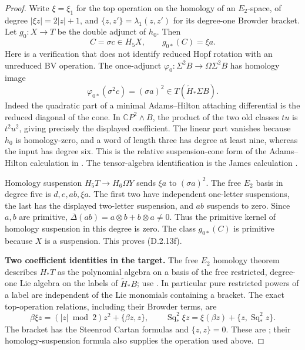 \begin{proof}
Write $\xi=\xi_1$ for the top operation on the homology of an
$E_2$-space, of degree $|\xi z|=2|z|+1$, and
$\{z,z'\}=\lambda_1(z,z')$ for its degree-one Browder bracket.
Let $g_0:X\to T$ be the double adjunct of $h_0$. Then
\[
 C=\sigma c\in H_5X,\qquad g_{0*}(C)=\xi a.
 \tag{D.2.13f}
\]
Here is a verification that does not identify reduced Hopf rotation
with an unreduced BV operation. The once-adjunct
$\varphi_0:\Sigma^2B\to\Omega\Sigma^2B$ has homology image
\[
 \varphi_{0*}(\sigma^2c)=(\sigma a)^2
       \in T(\widetilde H_*\Sigma B).
 \tag{D.2.13g}
\]
Indeed the quadratic part of a minimal Adams--Hilton attaching
differential is the reduced diagonal of the cone. In
$\mathbb CP^2\wedge B$, the product of the two old classes $tu$
is $t^2u^2$, giving precisely the displayed coefficient. The linear
part vanishes because $h_0$ is homology-zero, and a word of length
three has degree at least nine, whereas the input has degree six.
This is the relative suspension-cone form of the Adams--Hilton
calculation in \cite[\S3.1, p.~300; proof of Proposition~7.4,
p.~309]{FGHHalperinLemaire1995}. The tensor-algebra identification
is the James calculation \cite[\S3; Theorem~5.6 and Corollary~5.7]{I_James1955}.

Homology suspension $H_5T\to H_6\Omega Y$ sends $\xi a$ to
$(\sigma a)^2$. The free $E_2$ basis in degree five is
$d,e,ab,\xi a$. The first two have independent one-letter
suspensions, the last has the displayed two-letter suspension,
and $ab$ suspends to zero. Since $a,b$ are primitive,
$\overline\Delta(ab)=a\otimes b+b\otimes a\ne0$.
Thus the primitive kernel of homology suspension in this degree
is zero. The class $g_{0*}(C)$ is primitive because $X$ is a
suspension. This proves \textup{(D.2.13f)}.

\medskip\noindent
\textbf{Two coefficient identities in the target.}
The free $E_2$ homology theorem describes $H_*T$ as the polynomial
algebra on a basis of the free restricted, degree-one Lie algebra
on the labels of $\widetilde H_*B$; use
\cite[Chapter III, Theorems~3.1--3.2 and Lemma~3.8]{I_CohenLadaMay1976}.
In particular pure restricted powers of a label are independent
of the Lie monomials containing a bracket. The exact top-operation
relations, including their Browder terms, are
\[
 \beta\xi z=(|z|\bmod2)z^2+\{\beta z,z\},\qquad
 \operatorname{Sq}_*^2\xi z=\xi(\beta z)+\{z,\operatorname{Sq}_*^2z\}.
 \tag{D.2.13h}
\]
The bracket has the Steenrod Cartan formulas and $\{z,z\}=0$.
These are \cite[Chapter III, Theorems~1.2--1.4,
pp.~216--219]{I_CohenLadaMay1976}; their homology-suspension formula
also supplies the operation used above.


\end{proof}
